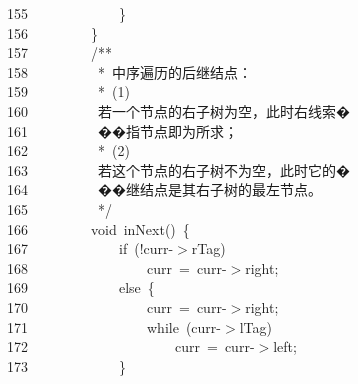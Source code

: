 \documentclass[11pt,a4paper]{ctexart}
\newcommand{\hlstd}[1]{\textcolor[rgb]{0.2,0.2,0.2}{#1}}
\newcommand{\hlcom}[1]{\textcolor[rgb]{0.59,0.59,0.59}{#1}}
\newcommand{\hlopt}[1]{\textcolor[rgb]{0.2,0.2,0.2}{#1}}
\newcommand{\hllin}[1]{\textcolor[rgb]{0.59,0.59,0.59}{#1}}
\newcommand{\hlkwa}[1]{\textcolor[rgb]{0.23,0.42,0.78}{#1}}
\newcommand{\hlkwb}[1]{\textcolor[rgb]{0.63,0,0.31}{#1}}
\newcommand{\hlkwd}[1]{\textcolor[rgb]{0.78,0.23,0.41}{#1}}
\begin{document}
\hllin{155\ }\hlstd{}\hlstd{\ \ \ \ \ \ \ \ \ \ \ \ }\hlstd{}\hlopt{\}}\\
\hllin{156\ }\hlstd{}\hlstd{\ \ \ \ \ \ \ \ }\hlstd{}\hlopt{\}}\\
\hllin{157\ }\hlstd{}\hlstd{\ \ \ \ \ \ \ \ }\hlstd{}\hlcom{/{*}{*}}\\
\hllin{158\ }\hlcom{}\hlstd{\ \ \ \ \ \ \ \ \ }\hlcom{{*}\ 中序遍历的后继结点：}\\
\hllin{159\ }\hlcom{}\hlstd{\ \ \ \ \ \ \ \ \ }\hlcom{{*}\ (1)}\Righttorque\\
\hllin{160\ }\hlcom{}\hlstd{\ \ \ \ \ \ \ \ \ }\hlcom{若一个节点的右子树为空，此时右线索�}\Righttorque\\
\hllin{161\ }\hlcom{}\hlstd{\ \ \ \ \ \ \ \ \ }\hlcom{��指节点即为所求；}\\
\hllin{162\ }\hlcom{}\hlstd{\ \ \ \ \ \ \ \ \ }\hlcom{{*}\ (2)}\Righttorque\\
\hllin{163\ }\hlcom{}\hlstd{\ \ \ \ \ \ \ \ \ }\hlcom{若这个节点的右子树不为空，此时它的�}\Righttorque\\
\hllin{164\ }\hlcom{}\hlstd{\ \ \ \ \ \ \ \ \ }\hlcom{��继结点是其右子树的最左节点。}\\
\hllin{165\ }\hlcom{}\hlstd{\ \ \ \ \ \ \ \ \ }\hlcom{{*}/}\hlstd{}\\
\hllin{166\ }\hlstd{}\hlstd{\ \ \ \ \ \ \ \ }\hlstd{}\hlkwb{void\ }\hlstd{}\hlkwd{inNext}\hlstd{}\hlopt{()\ \{}\\
\hllin{167\ }\hlstd{}\hlstd{\ \ \ \ \ \ \ \ \ \ \ \ }\hlstd{}\hlkwa{if\ }\hlstd{}\hlopt{(!}\hlstd{curr}\hlopt{{-}$>$}\hlstd{rTag}\hlopt{)}\\
\hllin{168\ }\hlstd{}\hlstd{\ \ \ \ \ \ \ \ \ \ \ \ \ \ \ \ }\hlstd{curr\ }\hlopt{=\ }\hlstd{curr}\hlopt{{-}$>$}\hlstd{right}\hlopt{;}\\
\hllin{169\ }\hlstd{}\hlstd{\ \ \ \ \ \ \ \ \ \ \ \ }\hlstd{}\hlkwa{else\ }\hlstd{}\hlopt{\{}\\
\hllin{170\ }\hlstd{}\hlstd{\ \ \ \ \ \ \ \ \ \ \ \ \ \ \ \ }\hlstd{curr\ }\hlopt{=\ }\hlstd{curr}\hlopt{{-}$>$}\hlstd{right}\hlopt{;}\\
\hllin{171\ }\hlstd{}\hlstd{\ \ \ \ \ \ \ \ \ \ \ \ \ \ \ \ }\hlstd{}\hlkwa{while\ }\hlstd{}\hlopt{(}\hlstd{curr}\hlopt{{-}$>$}\hlstd{lTag}\hlopt{)}\\
\hllin{172\ }\hlstd{}\hlstd{\ \ \ \ \ \ \ \ \ \ \ \ \ \ \ \ \ \ \ \ }\hlstd{curr\ }\hlopt{=\ }\hlstd{curr}\hlopt{{-}$>$}\hlstd{left}\hlopt{;}\\
\hllin{173\ }\hlstd{}\hlstd{\ \ \ \ \ \ \ \ \ \ \ \ }\hlstd{}\hlopt{\}}\\
\end{document}
